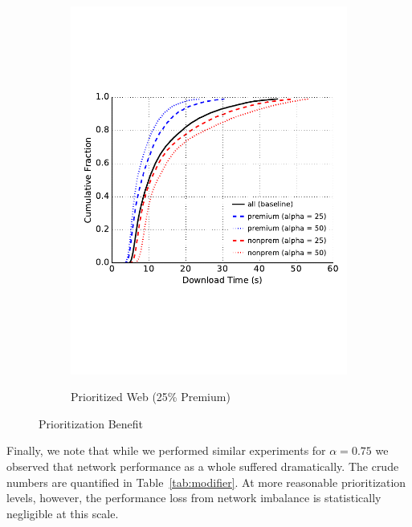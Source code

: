 \begin{figure}
\begin{subfigure}[t]{0.32\textwidth}
\includegraphics[trim={0 3cm 0 3cm}, clip, width=1.0\textwidth]{images/modifier_pr25_web.pdf}
		\label{fig:stats_c}
		\caption{Prioritized Web (25\% Premium)}
	\end{subfigure}
	\label{fig:measurements}
	\caption{Prioritization Benefit}
\end{figure}

Finally, we note that while we performed similar experiments for $\alpha = 0.75$
we observed that network performance as a whole suffered dramatically. The crude
numbers are quantified in Table~\ref{tab:modifier}. At more reasonable
prioritization levels, however, the performance loss from network imbalance is
statistically negligible at this scale.

